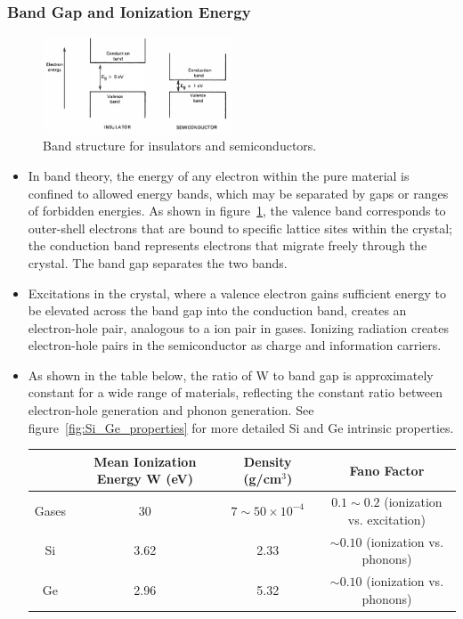 \subsubsection{Band Gap and Ionization Energy}
\begin{figure}[ht]
    \centering
    \includegraphics[width=0.5\textwidth]{images/semiconductor_band_structure.png}
    \caption{Band structure for insulators and semiconductors.}
    \label{fig:semiconductor_band_structure}
\end{figure}
\begin{itemize}
    \item In band theory, the energy of any electron within the pure material is confined to allowed energy bands, which may be separated by gaps or ranges of forbidden energies. As shown in figure~\ref{fig:semiconductor_band_structure}, the valence band corresponds to outer-shell electrons that are bound to specific lattice sites within the crystal; the conduction band represents electrons that migrate freely through the crystal. The band gap separates the two bands.
    \item Excitations in the crystal, where a valence electron gains sufficient energy to be elevated across the band gap into the conduction band, creates an electron-hole pair, analogous to a ion pair in gases. Ionizing radiation creates electron-hole pairs in the semiconductor as charge and information carriers. 
    \item As shown in the table below, the ratio of W to band gap is approximately constant for a wide range of materials, reflecting the constant ratio between electron-hole generation and phonon generation. See figure~\ref{fig:Si_Ge_properties} for more detailed Si and Ge intrinsic properties.
    \begin{center}
        \begin{tabular}{|c|c|c|c|}
        \hline
         &  Mean Ionization Energy W (eV) & Density (g/cm$^3$) & Fano Factor \\
        \hline
        Gases     & 30 & $7\sim50\times10^{-4}$ & $0.1\sim0.2$ (ionization vs. excitation)\\
        \hline
        Si & 3.62 & 2.33 & $\sim0.10$ (ionization vs. phonons)\\
        \hline
        Ge & 2.96 & 5.32 & $\sim0.10$ (ionization vs. phonons)\\
        \hline
        \end{tabular}
    \end{center}
\end{itemize}
